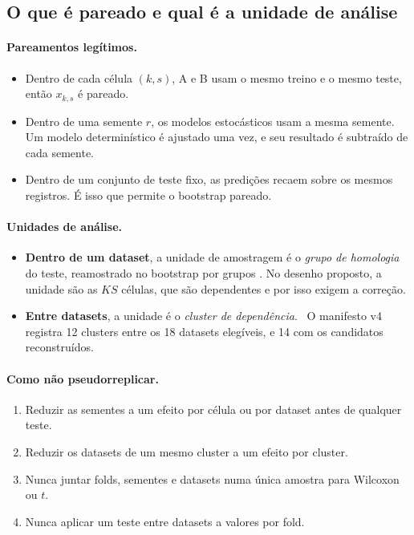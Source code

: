 \documentclass[11pt,a4paper]{article}
\newcommand{\etiqueta}[2]{\tcbox[on line, colback=#1!10, colframe=#1!75!black,
  boxrule=0.4pt, arc=1.2pt, left=1.5pt, right=1.5pt, top=0pt, bottom=0pt,
  fontupper=\sffamily\scriptsize\bfseries]{#2}}
\newcommand{\proj}{\etiqueta{oiGreen}{Projeto}}
\begin{document}
\subsection{O que é pareado e qual é a unidade de análise}
\label{sec:unidade}

\paragraph{Pareamentos legítimos.}
\begin{itemize}[leftmargin=1.4em]
\item Dentro de cada célula $(k,s)$, A e B usam o mesmo treino e o mesmo teste, então $x_{k,s}$ é pareado.
\item Dentro de uma semente $r$, os modelos estocásticos usam a mesma semente. Um modelo determinístico é ajustado uma vez, e seu resultado é subtraído de cada semente.
\item Dentro de um conjunto de teste fixo, as predições recaem sobre os mesmos registros. É isso que permite o bootstrap pareado.
\end{itemize}

\paragraph{Unidades de análise.}
\begin{itemize}[leftmargin=1.4em]
\item \textbf{Dentro de um dataset}, a unidade de amostragem é o \emph{grupo de homologia} do teste, reamostrado no bootstrap por grupos \citep{field2007}. No desenho proposto, a unidade são as $KS$ células, que são dependentes e por isso exigem a correção.
\item \textbf{Entre datasets}, a unidade é o \emph{cluster de dependência}. \proj\ O manifesto v4 registra 12 clusters entre os 18 datasets elegíveis, e 14 com os candidatos reconstruídos.
\end{itemize}

\paragraph{Como não pseudorreplicar.}
\begin{enumerate}[leftmargin=1.4em]
\item Reduzir as sementes a um efeito por célula ou por dataset antes de qualquer teste.
\item Reduzir os datasets de um mesmo cluster a um efeito por cluster.
\item Nunca juntar folds, sementes e datasets numa única amostra para Wilcoxon ou $t$.
\item Nunca aplicar um teste entre datasets a valores por fold.
\end{enumerate}
\end{document}
